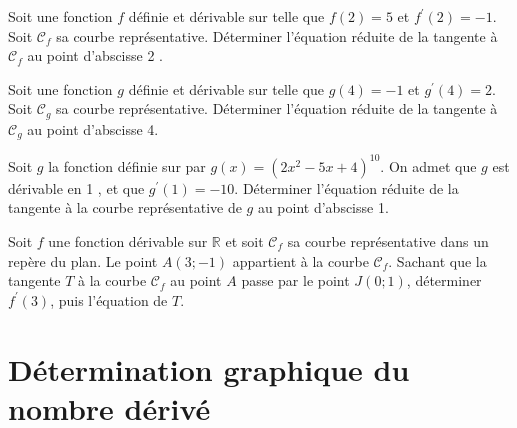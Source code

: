 \documentclass[11pt,a4paper]{article}  %
\begin{document}
\exercice{}

Soit une fonction $f$ définie et dérivable sur \R telle que $f(2)=5$ et $f^{\prime}(2)=-1$.
Soit $\mathscr{C}_f$ sa courbe représentative. Déterminer l'équation réduite de la tangente à $\mathscr{C}_f$ au point d'abscisse 2 .

\exercice{}

Soit une fonction $g$ définie et dérivable sur \R telle que $g(4)=-1$ et $g^{\prime}(4)=2$. Soit $\mathscr{C}_g$ sa courbe représentative. Déterminer l'équation réduite de la tangente à $\mathscr{C}_g$ au point d'abscisse 4.

\exercice{}

Soit $g$ la fonction définie sur \R par $g(x)=\left(2 x^2-5 x+4\right)^{10}$. On admet que $g$ est dérivable en 1 , et que $g^{\prime}(1)=-10$. Déterminer l'équation réduite de la tangente à la courbe représentative de $g$ au point d'abscisse 1.

\exercice{}

Soit $f$ une fonction dérivable sur $\mathbb{R}$ et soit $\mathscr{C}_f$ sa courbe représentative dans un repère du plan. Le point $A(3 ;-1)$ appartient à la courbe $\mathscr{C}_f$.
Sachant que la tangente $T$ à la courbe $\mathscr{C}_f$ au point $A$ passe par le point $J(0 ; 1)$, déterminer $f^{\prime}(3)$, puis l'équation de $T$.

\section*{Détermination graphique du nombre dérivé}
\end{document}
